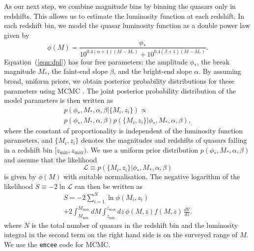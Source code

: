 \documentclass[fleqn,usenatbib]{mnras}
\begin{document}
    As our next step, we combine magnitude bins by binning the quasars
    only in redshifts.  This allows us to estimate the luminosity function
    at each redshift.  In each redshift bin, we model the quasar
    luminosity function as a double power law given by
    \citep{1988MNRAS.235..935B, 1995ApJ...438..623P, 2000MNRAS.317.1014B}
    \begin{equation}
      \phi(M) =
      \frac{\phi_*}{10^{0.4(\alpha+1)(M-M_*)}+10^{0.4(\beta+1)(M-M_*)}}.
      \label{eqn:dpl}
    \end{equation}
    Equation~(\ref{eqn:dpl}) has four free parameters: the amplitude
    $\phi_*$, the break magnitude $M_*$, the faint-end slope $\beta$, and
    the bright-end slope $\alpha$.  By assuming broad, uniform priors, we
    obtain posterior probability distributions for these parameters using
    MCMC \citep[e.g.,][]{jaynes}.  The joint posterior probability
    distribution of the model parameters is then written as
    \begin{multline}
      p(\phi_*, M_*, \alpha, \beta | \{M_i, z_i\}) \propto \\ p(\phi_*, M_*,
      \alpha, \beta)p(\{M_i, z_i\} | \phi_*, M_*, \alpha, \beta),
    \end{multline}
    where the constant of proportionality is independent of the luminosity
    function parameters, and $\{M_i, z_i\}$ denotes the magnitudes and
    redshifts of quasars falling in a redshift bin $[z_\mathrm{min},
      z_\mathrm{max})$.  We use a uniform prior distribution $p(\phi_*,
      M_*, \alpha, \beta)$ and assume that the likelihood
      \begin{equation}
        \mathcal{L}\equiv p(\{M_i, z_i\} | \phi_*, M_*, \alpha, \beta)
      \end{equation}
      is given by $\phi(M)$ with suitable normalisation.  The negative
      logarithm of the likelihood $S\equiv -2\ln\mathcal{L}$ can then be
      written as
      \begin{multline}
        S = -2\sum_{i=1}^N\ln\phi(M_i, z_i)\\+2\int_{M_\mathrm{min}}^{M_\mathrm{max}}dM
        \int_{z_\mathrm{min}}^{z_\mathrm{max}}dz\, \phi(M,z) f(M, z)\,\frac{dV}{dz}.
        \label{eqn:S}
      \end{multline}
      where $N$ is the total number of quasars in the redshift bin and the
      luminosity integral in the second term on the right hand side is on
      the surveyed range of $M$.  We use the \texttt{emcee} code
      \citep{2013PASP..125..306F} for MCMC.
\end{document}
